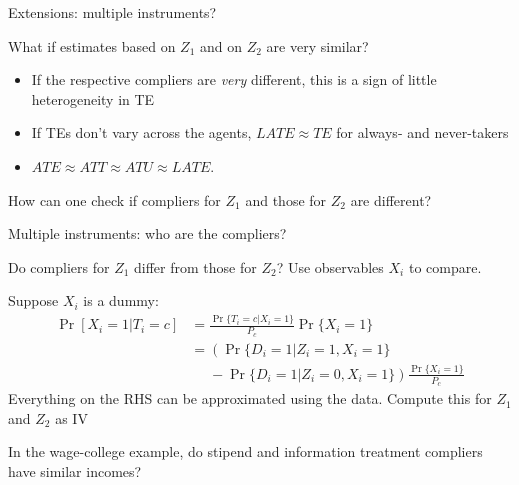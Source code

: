 \documentclass[notes=show,beamer,compress]{beamer}
\begin{document}
\begin{frame}{Extensions: multiple instruments?}
	
	What if estimates based on $Z_1$ and on $Z_2$ are very similar?
	\begin{itemize}
		\item If the respective compliers are \emph{very} different, this is a sign of little heterogeneity in TE
		\item If TEs don't vary across the agents, $LATE\approx TE$ for always- and never-takers
		\item $ATE\approx ATT \approx ATU \approx LATE$. 
	\end{itemize}
	How can one check if compliers for $Z_1$ and those for $Z_2$ are different?
\end{frame}

\begin{frame}{Multiple instruments: who are the compliers?}
	
	Do compliers for $Z_1$ differ from those for $Z_2$? Use observables $X_i$ to compare.\\\medskip
	
	Suppose $X_i$ is a dummy:
	\begin{align*}
		\Pr[X_i=1|T_i=c] &= \frac{\Pr\{T_i=c|X_i=1\}}{P_c}\Pr\{X_i=1\}\\
		&= \left(\Pr\{D_i=1|Z_i=1, X_i=1\} \right.\\
		&\phantom{=}- \left.\Pr\{D_i=1|Z_i=0, X_i=1\}\right)\frac{\Pr\{X_i=1\}}{P_c}
	\end{align*}
	Everything on the RHS can be approximated using the data. Compute this for $Z_1$ and $Z_2$ as IV\\\bigskip
	
	In the wage-college example, do stipend and information treatment compliers have similar incomes?
	
\end{frame}
\end{document}
